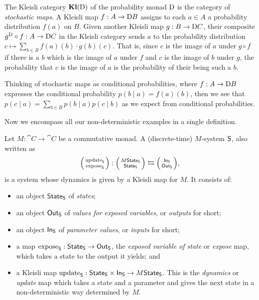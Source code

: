 \documentclass[DynamicalBook]{subfiles}
\begin{document}
\begin{example}\label{ex.probset_kleisli}
  The Kleisli category $\textbf{Kl}(\mathrm{D})$ of the probability monad $\mathrm{D}$
  is the category of \emph{stochastic maps}. A Kleisli map $f : A \to \mathrm{D}
  B$ assigns to each $a \in A$ a probability distribution $f(a)$ on $B$. Given
  another Kleisli map $g : B \to \mathrm{D} C$, their composite $g^{\mathrm{D}}
  \circ f : A \to \mathrm{D} C$ in the Kleisli category sends $a$ to the
  probability distribution $c \mapsto \sum_{b \in B}
  f(a)(b) \cdot g(b)(c)$. That is, since $c$ is the image of $a$ under $g \circ f$ if there is a $b$ which
  is the image of $a$ under $f$ and $c$ is the image of $b$ under $g$, the
  probability that $c$ is the image of $a$ is the probability of their being
  such a $b$.

  Thinking of stochastic maps as conditional probabilities, where $f : A \to
  \mathrm{D} B$ expresses the conditional probability $p(b \mid a) = f(a)(b)$,
  then we see that
  $p(c \mid a) = \sum_{b \in B} p(b \mid a) p(c \mid b)$
  as we expect from conditional probabilities.
\end{example}


Now we encompass all our non-deterministic examples in a single definition.
\begin{definition}\label{def.monadic_system}
Let $M : \cat{C} \to \cat{C}$ be a commutative monad. A (discrete-time)
$M$-system $\mathsf{S}$, also written as   
  $$\lens{\update{S}}{\expose{S}} : \lens{M\State{S}}{\State{S}} \leftrightarrows \lens{\In{S}}{\Out{S}},$$ 
is a system whose dynamics is given by a Kleisli map for $M$. It consists of:
  \begin{itemize}
    \item an object $\mathsf{State}_{\mathsf{S}}$ of \emph{states};
    \item an object $\mathsf{Out}_{\mathsf{S}}$ of \emph{values for exposed variables}, or \emph{outputs}
      for short;
    \item an object $\mathsf{In}_{\mathsf{S}}$ of \emph{parameter values}, or \emph{inputs} for short;
    \item a map $\mathrm{expose}_{\mathsf{S}} : \mathsf{State}_{\mathsf{S}} \to \mathsf{Out}_{\mathsf{S}}$, the \emph{exposed variable of state} or
      \emph{expose} map, which takes a state to the output it yields; and
    \item a Kleisli map $\mathrm{update}_{\mathsf{S}} : \mathsf{State}_{\mathsf{S}} \times \mathsf{In}_{\mathsf{S}} \to
     M\mathsf{State}_{\mathsf{S}}$. This is the \emph{dynamics} or
      \emph{update} map which takes a state and a parameter and gives the
      next state in a non-deterministic way determined by $M$.
  \end{itemize}
\end{definition}
\end{document}
